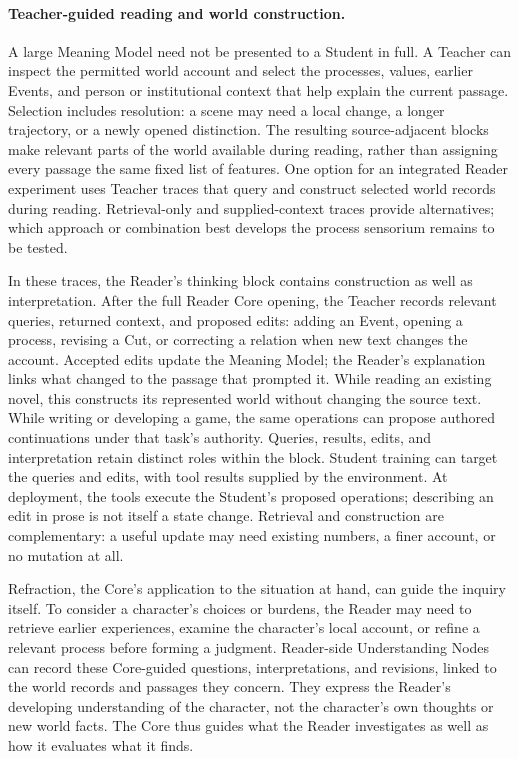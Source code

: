 \documentclass[10pt]{article}
\begin{document}
\paragraph{Teacher-guided reading and world construction.}
\label{par:teacher-world-context}
A large Meaning Model need not be presented to a Student in full. A Teacher
can inspect the permitted world account and select the processes, values,
earlier Events, and person or institutional context that help explain the
current passage. Selection includes resolution: a scene may need a local
change, a longer trajectory, or a newly opened distinction. The resulting
source-adjacent blocks make relevant parts of the world available during
reading, rather than assigning every passage the same fixed list of features.
One option for an integrated Reader experiment uses Teacher traces that query
and construct selected world records during reading. Retrieval-only and
supplied-context traces provide alternatives; which approach or combination
best develops the process sensorium remains to be tested.

In these traces, the Reader's thinking block contains construction as well as
interpretation. After the full Reader Core opening, the Teacher
records relevant queries, returned context, and proposed edits: adding an Event,
opening a process, revising a Cut, or correcting a relation when new text
changes the account. Accepted edits update the Meaning Model; the Reader's
explanation links what changed to the passage that prompted it. While reading
an existing novel, this constructs its represented world without changing the
source text. While writing or developing a game, the same operations can
propose authored continuations under that task's authority. Queries, results,
edits, and interpretation retain distinct roles within the block. Student
training can target the queries and edits, with tool results supplied by the
environment. At deployment, the tools execute the Student's proposed operations;
describing an edit in prose is not itself a state change. Retrieval and
construction are complementary: a useful update may need existing numbers,
a finer account, or no mutation at all.

Refraction, the Core's application to the situation at hand, can guide the
inquiry itself. To consider a character's choices or
burdens, the Reader may need to retrieve earlier experiences, examine the
character's local account, or refine a relevant process before forming a
judgment. Reader-side Understanding Nodes can record these Core-guided
questions, interpretations, and revisions, linked to the world records and
passages they concern. They express the Reader's developing understanding of
the character, not the character's own thoughts or new world facts. The Core
thus guides what the Reader investigates as well as how it evaluates what it
finds.
\end{document}
